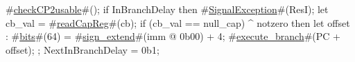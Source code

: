 #\hyperref[sailMIPSzcheckCP2usable]{checkCP2usable}#();
if InBranchDelay then
   #\hyperref[sailMIPSzSignalException]{SignalException}#(ResI);
let cb_val = #\hyperref[sailMIPSzreadCapReg]{readCapReg}#(cb);
if (cb_val == null_cap) ^ notzero then
{
  let offset : #\hyperref[sailMIPSzbits]{bits}#(64) = #\hyperref[sailMIPSzsignzyextend]{sign\_extend}#(imm @ 0b00) + 4;
  #\hyperref[sailMIPSzexecutezybranch]{execute\_branch}#(PC + offset);
};
NextInBranchDelay = 0b1;
